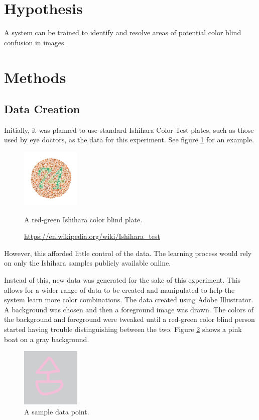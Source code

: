 \documentclass[12pt]{article}
\begin{document}
\section{Hypothesis}
A system can be trained to identify and resolve areas of potential color blind confusion in images.


\section{Methods}

\subsection{Data Creation}
Initially, it was planned to use standard Ishihara Color Test plates, such as those used by eye doctors, as the data for this experiment. See figure \ref{fig:ishi} for an example.

\begin{figure}[h]
	\centering
	\includegraphics[width=0.25\textwidth]{img/Ishihara}
	\caption{A red-green Ishihara color blind plate.}
	\caption*{\href{https://en.wikipedia.org/wiki/Ishihara\_test}{https://en.wikipedia.org/wiki/Ishihara\_test}}
	\label{fig:ishi}
\end{figure}

However, this afforded little control of the data. The learning process would rely on only the Ishihara samples publicly available online. 

Instead of this, new data was generated for the sake of this experiment. This allows for a wider range of data to be created and manipulated to help the system learn more color combinations. The data created using Adobe Illustrator. A background was chosen and then a foreground image was drawn. The colors of the background and foreground were tweaked until a red-green color blind person started having trouble distinguishing between the two. Figure \ref{fig:data1} shows a pink boat on a gray background.

\begin{figure}[h]
	\centering
	\includegraphics[width=0.25\textwidth]{img/rgb3}
	\caption{A sample data point.}
	\label{fig:data1}
\end{figure}
\end{document}
